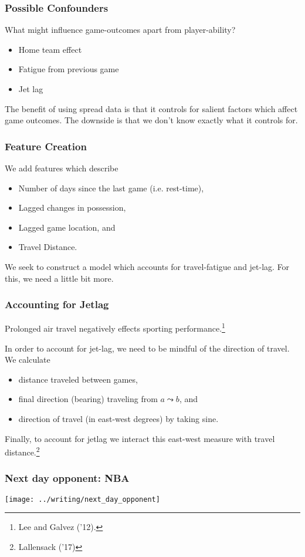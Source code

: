\documentclass{beamer}
\begin{document}
\begin{frame}   
  \frametitle{Possible Confounders}
  What might influence game-outcomes apart from player-ability?

  \begin{itemize}     
    \item Home team effect
    \item Fatigue from previous game
    \item Jet lag   
    \end{itemize}

  The benefit of using spread data is that it controls for salient factors which affect game outcomes.
  The downside is that we don't know exactly what it controls for. \end{frame}

\begin{frame}   \frametitle{Feature Creation}
  We add features which describe
  \begin{itemize}     
    \item Number of days since the last game (i.e. rest-time),
    \item Lagged changes in possession,
    \item Lagged game location, and
    \item Travel Distance.   
  \end{itemize}
  We seek to construct a model which accounts for travel-fatigue and jet-lag.
  For this, we need a little bit more. \end{frame}

\begin{frame}   \frametitle{Accounting for Jetlag}
  Prolonged air travel negatively effects sporting performance.\footnote{Lee and Galvez ('12).}

  In order to account for jet-lag, we need to be mindful of the direction of travel. We calculate
  \begin{itemize}     \item distance traveled between games,
    \item final direction (bearing) traveling from $a \leadsto b$, and
    \item direction of travel (in east-west degrees) by taking sine.
  \end{itemize}
  Finally, to account for jetlag we interact this east-west measure with travel distance.\footnote{Lallensack ('17)} \end{frame}

\begin{frame}   \frametitle{Next day opponent: NBA}
  \centering \texttt{[image: ../writing/next\_day\_opponent]} \end{frame}
\end{document}
